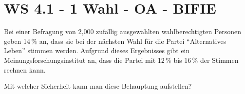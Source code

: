 \section{WS 4.1 - 1 Wahl - OA - BIFIE}

\begin{beispiel}[WS 4.1]{1}
Bei einer Befragung von 2,000 zufällig ausgewählten wahlberechtigten Personen geben 14\,\%
an, dass sie bei der nächsten Wahl für die Partei "`Alternatives Leben"' stimmen werden. Aufgrund dieses Ergebnisses gibt ein Meinungsforschungsinstitut an, dass die Partei mit 12\,\% bis 16\,\% der Stimmen rechnen kann.  

\leer

Mit welcher Sicherheit kann man diese Behauptung aufstellen? \\

\end{beispiel}